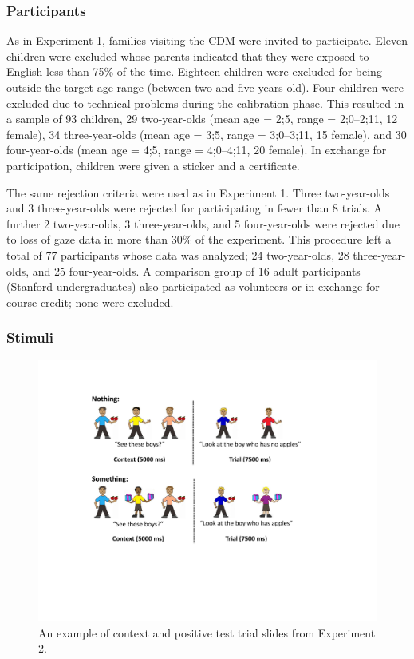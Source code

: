 \documentclass[man]{apa2}
\begin{document}
\subsubsection{Participants}

As in Experiment 1, families visiting the CDM were invited to participate.  Eleven children were excluded whose parents indicated that they were exposed to English less than 75\% of the time.  Eighteen children were excluded for being outside the target age range (between two and five years old).  Four children were excluded due to technical problems during the calibration phase.  This resulted in a sample of 93 children, 29 two-year-olds (mean age = 2;5, range = 2;0--2;11, 12 female), 34 three-year-olds (mean age = 3;5, range = 3;0--3;11, 15 female), and 30 four-year-olds (mean age = 4;5, range = 4;0--4;11, 20 female).  In exchange for participation, children were given a sticker and a certificate.  

The same rejection criteria were used as in Experiment 1.  Three two-year-olds and 3 three-year-olds were rejected for participating in fewer than 8 trials.  A further 2 two-year-olds, 3 three-year-olds, and 5 four-year-olds were rejected due to loss of gaze data in more than 30\% of the experiment.  This procedure left a total of 77 participants whose data was analyzed; 24 two-year-olds, 28 three-year-olds, and 25 four-year-olds. A comparison group of 16 adult participants (Stanford undergraduates) also participated as volunteers or in exchange for course credit; none were excluded.

\subsubsection{Stimuli}

\begin{figure}
\begin{center} 
\includegraphics[width=5in]{trialfigure_something.pdf}
\caption{\label{fig:e2stim} An example of context and positive test trial slides from Experiment 2. }
\end{center} 
\end{figure}
\end{document}
